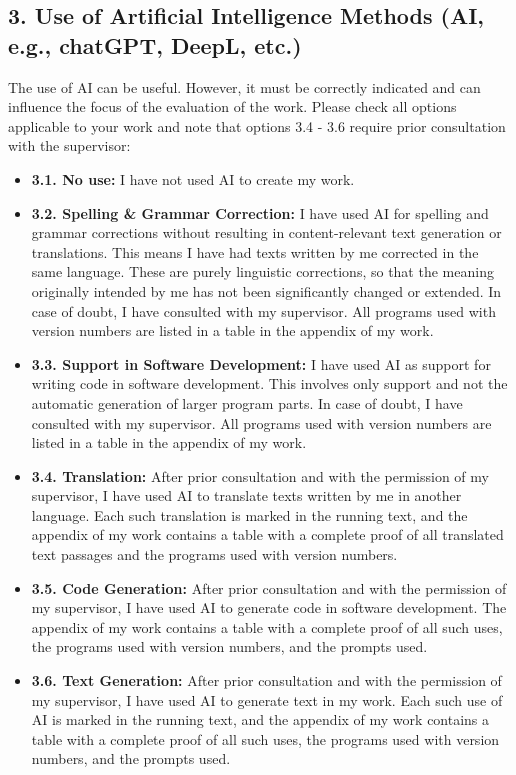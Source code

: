 {        \subsection*{3. Use of Artificial Intelligence Methods (AI, e.g., chatGPT, DeepL, etc.)}
        The use of AI can be useful. However, it must be correctly indicated and can influence the focus of the evaluation of the work. Please check all options applicable to your work and note that options 3.4 - 3.6 require prior consultation with the supervisor:
        \begin{itemize}
            \item[$\square$] \textbf{3.1. No use:} I have not used AI to create my work.
            \item[$\square$] \textbf{3.2. Spelling \& Grammar Correction:} I have used AI for spelling and grammar corrections without resulting in content-relevant text generation or translations. This means I have had texts written by me corrected in the same language. These are purely linguistic corrections, so that the meaning originally intended by me has not been significantly changed or extended. In case of doubt, I have consulted with my supervisor. All programs used with version numbers are listed in a table in the appendix of my work.
            \item[$\square$] \textbf{3.3. Support in Software Development:} I have used AI as support for writing code in software development. This involves only support and not the automatic generation of larger program parts. In case of doubt, I have consulted with my supervisor. All programs used with version numbers are listed in a table in the appendix of my work.
            \item[$\square$] \textbf{3.4. Translation:} After prior consultation and with the permission of my supervisor, I have used AI to translate texts written by me in another language. Each such translation is marked in the running text, and the appendix of my work contains a table with a complete proof of all translated text passages and the programs used with version numbers.
            \item[$\square$] \textbf{3.5. Code Generation:} After prior consultation and with the permission of my supervisor, I have used AI to generate code in software development. The appendix of my work contains a table with a complete proof of all such uses, the programs used with version numbers, and the prompts used.
            \item[$\square$] \textbf{3.6. Text Generation:} After prior consultation and with the permission of my supervisor, I have used AI to generate text in my work. Each such use of AI is marked in the running text, and the appendix of my work contains a table with a complete proof of all such uses, the programs used with version numbers, and the prompts used.
        \end{itemize}

}
